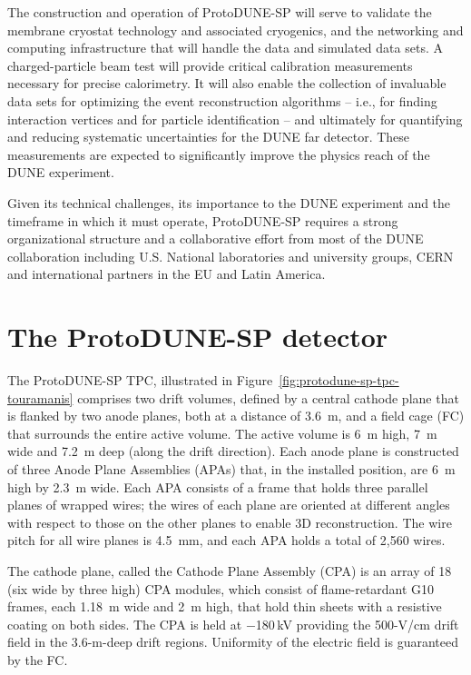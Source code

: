 The construction and operation of ProtoDUNE-SP will serve to validate the membrane cryostat technology and associated cryogenics, and the networking and computing infrastructure that will handle the data and simulated data sets.
A charged-particle beam test will provide critical calibration measurements necessary for precise calorimetry. It will also enable the collection of invaluable data sets for optimizing the event reconstruction algorithms -- i.e., for finding interaction vertices and for particle identification -- and ultimately for quantifying and reducing systematic uncertainties for the DUNE far detector. These measurements are expected to significantly improve the physics reach of the DUNE experiment.

Given its technical challenges, its importance to the DUNE experiment and the timeframe in which it must operate, ProtoDUNE-SP requires a strong organizational structure and a collaborative effort from most of the DUNE collaboration including U.S. National laboratories and university groups, CERN and international partners in the EU and Latin America. 


\section{The ProtoDUNE-SP detector}
\label{intro:detector}

The ProtoDUNE-SP TPC, illustrated in Figure~\ref{fig:protodune-sp-tpc-touramanis} comprises two drift volumes, defined by  a central cathode plane that is flanked by two anode planes, both at a distance of 3.6~m, and a field cage (FC) that surrounds the entire active volume. The active volume is 6~m high, 7~m wide and 7.2~m deep (along the drift direction).
Each anode plane is constructed of three Anode Plane Assemblies (APAs) that, in the installed position, are  6~m high by 2.3~m wide. Each APA consists of a frame that holds three parallel planes of wrapped wires; the wires of each plane are
oriented at different angles with respect to those on the other planes to enable 3D reconstruction.  The wire pitch for all wire planes is 4.5~mm, and each APA holds a total of 2,560 wires. 

The cathode plane, called the Cathode Plane Assembly (CPA) is an array of 18 (six wide by three high) CPA modules, which consist of flame-retardant G10 frames, each 1.18~m wide and 2~m high, that hold thin sheets with a resistive coating on both sides. 
The CPA is held at $-$180\,kV providing the 500-V/cm drift field in the 3.6-m-deep drift regions. 
Uniformity of the electric field is guaranteed by the FC.
 
